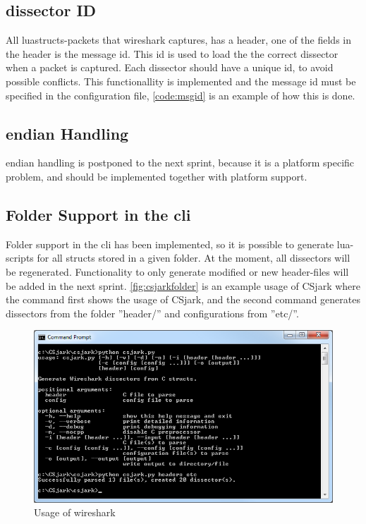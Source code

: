 \subsection{\Gls{dissector} ID}
All luastructs-\glspl{packet} that \Gls{wireshark} captures, has a \gls{header}, one of the fields in 
the \gls{header} is the message id. This id is used to load the the correct 
\gls{dissector} when a \gls{packet} is captured. Each \gls{dissector} should have a unique id, 
to avoid possible conflicts. This functionallity is implemented and the 
message id must be specified in the configuration file, \autoref{code:msgid} 
is an example of how this is done.



\subsection{\Gls{endian} Handling}
\Gls{endian} handling is postponed to the next sprint, because it is a platform 
specific problem, and should be implemented together with platform support.

\subsection{Folder Support in the \gls{cli}}
Folder support in the \gls{cli} has been 
implemented, so it is possible to generate \Gls{lua}-\glspl{script} for all \glspl{struct} stored 
in a given folder. At the moment, all \glspl{dissector} will be regenerated. 
Functionality to only generate modified or new \gls{header}-files will be added in 
the next sprint. \autoref{fig:csjarkfolder} is an example usage of CSjark where
the command first shows the usage of CSjark, and the second command 
generates \glspl{dissector} from the folder ''\gls{header}/'' and configurations from ''etc/''.

\begin{figure}[ht]
	\center
	\includegraphics[width=\textwidth]{./sprints/img/csjark_folder}
	\caption{Usage of \Gls{wireshark}\label{fig:csjarkfolder}}
\end{figure}


